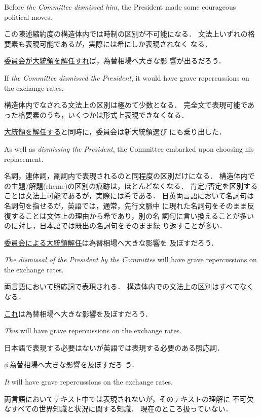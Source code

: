 \begin{DEPRED}
\begin{DEPEX}
Before {\it the Committee dismissed him}, the President made some
courageous political moves.
\end{DEPEX}
\depred この陳述縮約度の構造体内では時制の区別が不可能になる．
文法上いずれの格要素も表現可能であるが，実際には希にしか表現されなく
なる．
\vspace{-0.1mm}
\begin{DEPEX}
\depexample \underline{委員会が大統領を解任すれ}ば，為替相場へ大きな影
響が出るだろう．

If {\it the Committee dismissed the President}, it would have grave
repercussions on the exchange rates.
\end{DEPEX}
\depred 構造体内でなされる文法上の区別は極めて少数となる．
完全文で表現可能であった格要素のうち，いくつかは形式上表現できなくなる．
\begin{DEPEX}
\depexample \underline{大統領を解任する}と同時に，委員会は新大統領選び
にも乗り出した．

As well as {\it dismissing the President}, the Committee embarked upon
choosing his replacement.
\end{DEPEX}
\depred 名詞，連体詞，副詞内で表現されるのと同程度の区別だけになる．
構造体内での主題/解題(rheme)の区別の痕跡は，ほとんどなくなる．
肯定/否定を区別することは文法上可能であるが，実際には希である．
日英両言語において名詞句は名詞句を指せるが，英語では，通常，先行文脈中
に現れた名詞句をそのまま反復することは文体上の理由から希であり，別の名
詞句に言い換えることが多いのに対し，日本語では既出の名詞句をそのまま繰
り返すことが多い．
\begin{DEPEX}
\depexample \underline{委員会による大統領解任}は為替相場へ大きな影響を
及ぼすだろう．

{\it The dismissal of the President by the Committee} will have grave
repercussions on the exchange rates.
\end{DEPEX}
\depred 両言語において照応詞で表現される．
構造体内での文法上の区別はすべてなくなる．
\begin{DEPEX}
\depexample \underline{これ}は為替相場へ大きな影響を及ぼすだろう．

{\it This} will have grave repercussions on the exchange rates.
\end{DEPEX}
\depred 日本語で表現する必要はないが英語では表現する必要のある照応詞．
\begin{DEPEX}
\depexample \underline{$\phi_{}$}為替相場へ大きな影響を及ぼすだろ
う．

{\it It} will have grave repercussions on the exchange rates.
\end{DEPEX}
\depred 両言語においてテキスト中では表現されないが，そのテキストの理解に
不可欠なすべての世界知識と状況に関する知識．
現在のところ扱っていない．
\end{DEPRED}

